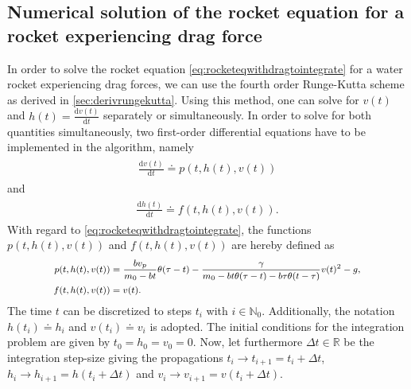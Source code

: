 \documentclass[a4paper,11pt]{report}
\begin{document}
\subsection{Numerical solution of the rocket equation for a rocket experiencing drag force}
In order to solve the rocket equation \cref{eq:rocketeqwithdragtointegrate} for a water rocket experiencing drag forces, we can use the fourth order Runge-Kutta scheme as derived in \cref{sec:derivrungekutta}. Using this method, one can solve for $v(t)$ and $h(t) = \frac{\mathrm{d}v(t)}{\mathrm{d}t}$ separately or simultaneously. In order to solve for both quantities simultaneously, two first-order differential equations have to be implemented in the algorithm, namely \begin{align}
	\begin{aligned}
		\frac{\mathrm{d}v(t)}{\mathrm{d}t} \doteq p(t, h(t), v(t))
	\end{aligned}
\end{align} and \begin{align}
\begin{aligned}
	\frac{\mathrm{d}h(t)}{\mathrm{d}t} \doteq f(t, h(t), v(t)).
\end{aligned}
\end{align} With regard to \cref{eq:rocketeqwithdragtointegrate}, the functions $p(t, h(t), v(t))$ and $f(t, h(t), v(t))$ are hereby defined as \begin{align}\footnotesize
\begin{aligned}\label{eq:reqdrag_rungekutta_1}
	p(t, h(t), v(t)) &= \frac{bv_p}{m_0-bt}\theta(\tau-t)-\frac{\gamma}{m_0-bt\theta(\tau-t)-b\tau\theta(t-\tau)}v(t)^2-g, \\
	f(t, h(t), v(t)) &= v(t).
\end{aligned}
\end{align} The time $t$ can be discretized to steps $t_i$ with $i \in \mathbb{N}_0$. Additionally, the notation $h(t_i) \doteq h_i$ and $v(t_i) \doteq v_i$ is adopted. The initial conditions for the integration problem are given by $t_0 = h_0 = v_0 = 0$. Now, let furthermore $\Delta t \in \mathbb{R}$ be the integration step-size giving the propagations $t_i \rightarrow t_{i+1} = t_i + \Delta t$, $h_i \rightarrow h_{i+1} = h(t_i+ \Delta t)$ and $v_i \rightarrow v_{i+1} = v(t_i + \Delta t)$.
\end{document}
